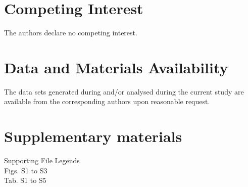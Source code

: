 \documentclass[12pt]{article}
\begin{document}
\section*{Competing Interest}
The authors declare no competing interest.
\section*{Data and Materials Availability}
The data sets generated during and/or analysed during the current study are available from the corresponding authors upon reasonable request.
\section*{Supplementary materials}
Supporting File Legends\\
Figs. S1 to S3\\
Tab. S1 to S5\\





\newpage
\end{document}
